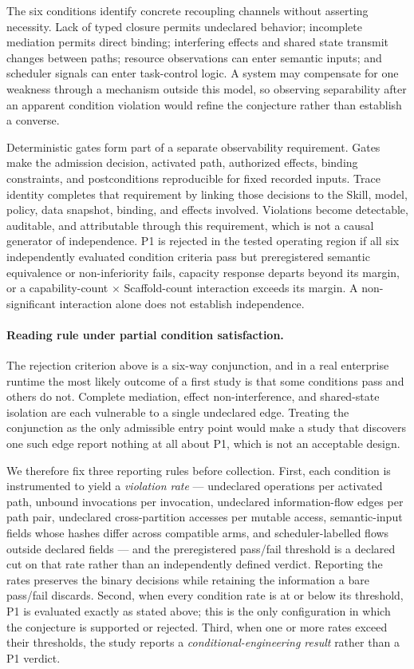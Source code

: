 The six conditions identify concrete recoupling channels without asserting necessity. Lack of typed closure permits undeclared behavior; incomplete mediation permits direct binding; interfering effects and shared state transmit changes between paths; resource observations can enter semantic inputs; and scheduler signals can enter task-control logic. A system may compensate for one weakness through a mechanism outside this model, so observing separability after an apparent condition violation would refine the conjecture rather than establish a converse.

Deterministic gates form part of a separate observability requirement. Gates make the admission decision, activated path, authorized effects, binding constraints, and postconditions reproducible for fixed recorded inputs.
Trace identity completes that requirement by linking those decisions to the Skill, model, policy, data snapshot, binding, and effects involved.
Violations become detectable, auditable, and attributable through this requirement, which is not a causal generator of independence. P1 is rejected in the tested operating region if all six independently evaluated condition criteria pass but preregistered semantic equivalence or non-inferiority fails, capacity response departs beyond its margin, or a capability-count $\times$ Scaffold-count interaction exceeds its margin. A non-significant interaction alone does not establish independence.

\paragraph{Reading rule under partial condition satisfaction.}
The rejection criterion above is a six-way conjunction, and in a real enterprise runtime the most likely outcome of a first study is that some conditions pass and others do not. Complete mediation, effect non-interference, and shared-state isolation are each vulnerable to a single undeclared edge. Treating the conjunction as the only admissible entry point would make a study that discovers one such edge report nothing at all about P1, which is not an acceptable design.

We therefore fix three reporting rules before collection. First, each condition is instrumented to yield a \textit{violation rate} --- undeclared operations per activated path, unbound invocations per invocation, undeclared information-flow edges per path pair, undeclared cross-partition accesses per mutable access, semantic-input fields whose hashes differ across compatible arms, and scheduler-labelled flows outside declared fields --- and the preregistered pass/fail threshold is a declared cut on that rate rather than an independently defined verdict. Reporting the rates preserves the binary decisions while retaining the information a bare pass/fail discards. Second, when every condition rate is at or below its threshold, P1 is evaluated exactly as stated above; this is the only configuration in which the conjecture is supported or rejected. Third, when one or more rates exceed their thresholds, the study reports a \textit{conditional-engineering result} rather than a P1 verdict.

